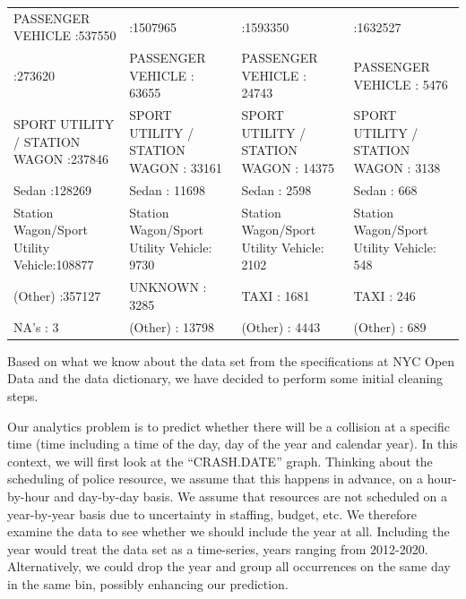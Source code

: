{\begin{tabular}{llll}
  \hline
PASSENGER VEHICLE                  :537550   &                                    :1507965   &                                    :1593350   &                                    :1632527   \\ 
                                     :273620   & PASSENGER VEHICLE                  :  63655   & PASSENGER VEHICLE                  :  24743   & PASSENGER VEHICLE                  :   5476   \\ 
  SPORT UTILITY / STATION WAGON      :237846   & SPORT UTILITY / STATION WAGON      :  33161   & SPORT UTILITY / STATION WAGON      :  14375   & SPORT UTILITY / STATION WAGON      :   3138   \\ 
  Sedan                              :128269   & Sedan                              :  11698   & Sedan                              :   2598   & Sedan                              :    668   \\ 
  Station Wagon/Sport Utility Vehicle:108877   & Station Wagon/Sport Utility Vehicle:   9730   & Station Wagon/Sport Utility Vehicle:   2102   & Station Wagon/Sport Utility Vehicle:    548   \\ 
  (Other)                            :357127   & UNKNOWN                            :   3285   & TAXI                               :   1681   & TAXI                               :    246   \\ 
  NA's                               :     3   & (Other)                            :  13798   & (Other)                            :   4443   & (Other)                            :    689   \\ 
   \hline
\end{tabular}
}

Based on what we know about the data set from the specifications at NYC
Open Data and the data dictionary, we have decided to perform some
initial cleaning steps.

Our analytics problem is to predict whether there will be a collision at
a specific time (time including a time of the day, day of the year and
calendar year). In this context, we will first look at the
``CRASH.DATE'' graph. Thinking about the scheduling of police resource,
we assume that this happens in advance, on a hour-by-hour and day-by-day
basis. We assume that resources are not scheduled on a year-by-year
basis due to uncertainty in staffing, budget, etc. We therefore examine
the data to see whether we should include the year at all. Including the
year would treat the data set as a time-series, years ranging from
2012-2020. Alternatively, we could drop the year and group all
occurrences on the same day in the same bin, possibly enhancing our
prediction.

